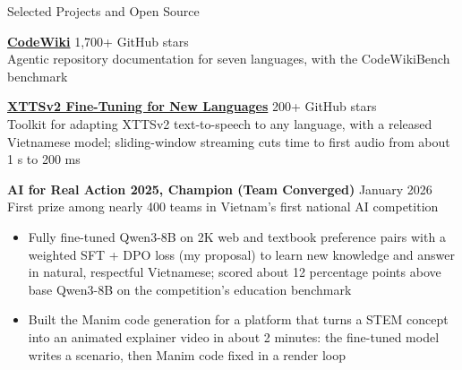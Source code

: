 \documentclass{resume} %
\begin{document}
\begin{rSection}{Selected Projects and Open Source}

\textbf{\href{https://github.com/FSoft-AI4Code/CodeWiki}{CodeWiki}}
\hfill 1,700+ GitHub stars\\
Agentic repository documentation for seven languages, with the CodeWikiBench benchmark

\vspace{0.15em}

\textbf{\href{https://github.com/anhnh2002/XTTSv2-Finetuning-for-New-Languages}
{XTTSv2 Fine-Tuning for New Languages}}
\hfill 200+ GitHub stars\\
Toolkit for adapting XTTSv2 text-to-speech to any language, with a released Vietnamese
model; sliding-window streaming cuts time to first audio from about 1 s to 200 ms

\vspace{0.15em}

\textbf{AI for Real Action 2025, Champion (Team Converged)}
\hfill January 2026\\
First prize among nearly 400 teams in Vietnam's first national AI competition

\begin{itemize}[leftmargin=1.5em,itemsep=0em,topsep=0.1em]
    \item Fully fine-tuned Qwen3-8B on 2K web and textbook preference pairs with a
    weighted SFT + DPO loss (my proposal) to learn new knowledge and answer in
    natural, respectful Vietnamese; scored about 12 percentage points above base
    Qwen3-8B on the competition's education benchmark
    \item Built the Manim code generation for a platform that turns a STEM concept
    into an animated explainer video in about 2 minutes: the fine-tuned model
    writes a scenario, then Manim code fixed in a render loop
\end{itemize}

\end{rSection}

\end{document}
